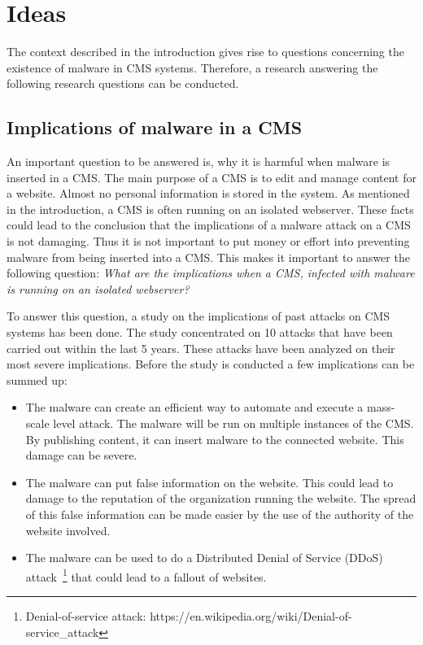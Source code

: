 \documentclass[a4paper, 10pt, conference]{ieeeconf}
\begin{document}
\section{Ideas}\label{sec:Section2}
The context described in the introduction gives rise to questions concerning the existence of malware in CMS systems. Therefore, a research answering the following research questions can be conducted.


\subsection{Implications of malware in a CMS}\label{subsec:Secion2-1}
An important question to be answered is, why it is harmful when malware is inserted in a CMS. The main purpose of a CMS is to edit and manage content for a website. Almost no personal information is stored in the system. As mentioned in the introduction, a CMS is often running on an isolated webserver. These facts could lead to the conclusion that the implications of a malware attack on a CMS is not damaging. Thus it is not important to put money or effort into preventing malware from being inserted into a CMS. This makes it important to answer the following question: \textit{What are the implications when a CMS, infected with malware is running on an isolated webserver?}

To answer this question, a study on the implications of past attacks on CMS systems has been done. The study concentrated on 10 attacks that have been carried out within the last 5 years. These attacks have been analyzed on their most severe implications. Before the study is conducted a few implications can be summed up:
\begin{itemize}
\item The malware can create an efficient way to automate and execute a mass-scale level attack. The malware will be run on multiple instances of the CMS. By publishing content, it can insert malware to the connected website. This damage can be severe.
\item The malware can put false information on the website. This could lead to damage to the reputation of the organization running the website. The spread of this false information can be made easier by the use of the authority of the website involved.
\item The malware can be used to do a Distributed Denial of Service (DDoS) attack~\footnote{Denial-of-service attack: https://en.wikipedia.org/wiki/Denial-of-service\_attack} that could lead to a fallout of websites.
\end{itemize}
\end{document}
